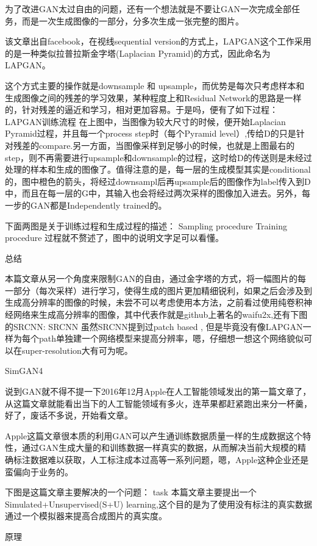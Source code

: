 为了改进GAN太过自由的问题，还有一个想法就是不要让GAN一次完成全部任务，而是一次生成图像的一部分，分多次生成一张完整的图片。

该文章出自facebook，在视线sequential version的方式上，LAPGAN这个工作采用的是一种类似拉普拉斯金字塔(Laplacian Pyramid)的方式，因此命名为LAPGAN。

这个方式主要的操作就是downsample 和 upsample，而优势是每次只考虑样本和生成图像之间的残差的学习效果，某种程度上和Residual Network的思路是一样的，针对残差的逼近和学习，相对更加容易。于是吗，便有了如下过程： LAPGAN训练流程 在上图中，当图像为较大尺寸的时候，便开始Laplacian Pyramid过程，并且每一个process step时（每个Pyramid level）,传给D的只是针对残差的compare.另一方面，当图像采样到足够小的时候，也就是上图最右的step，则不再需要进行upsample和downsample的过程，这时给D的传送则是未经过处理的样本和生成的图像了。值得注意的是，每一层的生成模型其实是conditional的，图中橙色的箭头，将经过downsampl后再upsample后的图像作为label传入到D中，而且在每一层的G中，其输入也会将经过两次采样的图像加入进去。另外，每一步的GAN都是Independently trained的。

下面两图是关于训练过程和生成过程的描述： Sampling procedure Training procedure 过程就不赘述了，图中的说明文字足可以看懂。

总结

本篇文章从另一个角度来限制GAN的自由，通过金字塔的方式，将一幅图片的每一部分（每次采样）进行学习，使得生成的图片更加精细锐利，如果之后会涉及到生成高分辨率的图像的时候，未尝不可以考虑使用本方法，之前看过使用纯卷积神经网络来生成高分辨率的图像，其中代表作就是github上著名的waifu2x,还有下图的SRCNN: SRCNN 虽然SRCNN提到过patch based , 但是毕竟没有像LAPGAN一样为每个path单独建一个网络模型来提高分辨率，嗯，仔细想一想这个网络貌似可以在super-resolution大有可为呢。

SimGAN4

说到GAN就不得不提一下2016年12月Apple在人工智能领域发出的第一篇文章了，从这篇文章就能看出当下的人工智能领域有多火，连苹果都赶紧跑出来分一杯羹，好了，废话不多说，开始看文章。

Apple这篇文章很本质的利用GAN可以产生通训练数据质量一样的生成数据这个特性，通过GAN生成大量的和训练数据一样真实的数据，从而解决当前大规模的精确标注数据难以获取，人工标注成本过高等一系列问题，嗯，Apple这种企业还是蛮偏向于业务的。

下图是这篇文章主要解决的一个问题： task 本篇文章主要提出一个Simulated+Unsupervised(S+U) learning,这个目的是为了使用没有标注的真实数据通过一个模拟器来提高合成图片的真实度。

原理

